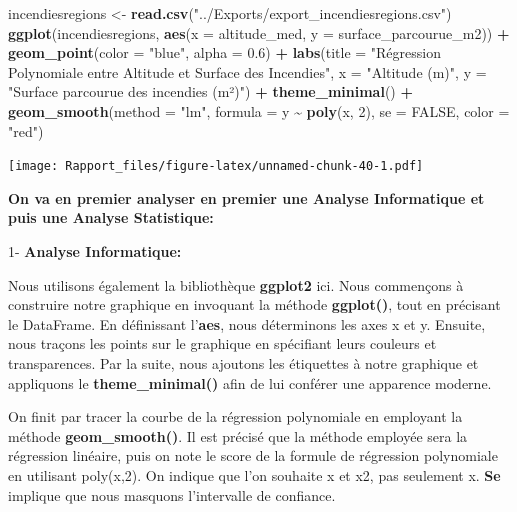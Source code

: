 \documentclass[
]{article}
\newenvironment{Shaded}{\begin{snugshade}}{\end{snugshade}}
\newcommand{\AttributeTok}[1]{\textcolor[rgb]{0.13,0.29,0.53}{#1}}
\newcommand{\ConstantTok}[1]{\textcolor[rgb]{0.56,0.35,0.01}{#1}}
\newcommand{\DecValTok}[1]{\textcolor[rgb]{0.00,0.00,0.81}{#1}}
\newcommand{\FloatTok}[1]{\textcolor[rgb]{0.00,0.00,0.81}{#1}}
\newcommand{\FunctionTok}[1]{\textcolor[rgb]{0.13,0.29,0.53}{\textbf{#1}}}
\newcommand{\NormalTok}[1]{#1}
\newcommand{\OtherTok}[1]{\textcolor[rgb]{0.56,0.35,0.01}{#1}}
\newcommand{\SpecialCharTok}[1]{\textcolor[rgb]{0.81,0.36,0.00}{\textbf{#1}}}
\newcommand{\StringTok}[1]{\textcolor[rgb]{0.31,0.60,0.02}{#1}}
\begin{document}
\begin{Shaded}
\begin{Highlighting}[]
\NormalTok{incendiesregions }\OtherTok{\textless{}{-}} \FunctionTok{read.csv}\NormalTok{(}\StringTok{"../Exports/export\_incendiesregions.csv"}\NormalTok{)}
\FunctionTok{ggplot}\NormalTok{(incendiesregions, }\FunctionTok{aes}\NormalTok{(}\AttributeTok{x =}\NormalTok{ altitude\_med, }\AttributeTok{y =}\NormalTok{ surface\_parcourue\_m2)) }\SpecialCharTok{+}
  \FunctionTok{geom\_point}\NormalTok{(}\AttributeTok{color =} \StringTok{"blue"}\NormalTok{, }\AttributeTok{alpha =} \FloatTok{0.6}\NormalTok{) }\SpecialCharTok{+}
  \FunctionTok{labs}\NormalTok{(}\AttributeTok{title =} \StringTok{"Régression Polynomiale entre Altitude et Surface des Incendies"}\NormalTok{,}
       \AttributeTok{x =} \StringTok{"Altitude (m)"}\NormalTok{, }\AttributeTok{y =} \StringTok{"Surface parcourue des incendies (m²)"}\NormalTok{) }\SpecialCharTok{+}
  \FunctionTok{theme\_minimal}\NormalTok{() }\SpecialCharTok{+}
  \FunctionTok{geom\_smooth}\NormalTok{(}\AttributeTok{method =} \StringTok{"lm"}\NormalTok{, }\AttributeTok{formula =}\NormalTok{ y }\SpecialCharTok{\textasciitilde{}} \FunctionTok{poly}\NormalTok{(x, }\DecValTok{2}\NormalTok{), }\AttributeTok{se =} \ConstantTok{FALSE}\NormalTok{, }\AttributeTok{color =} \StringTok{"red"}\NormalTok{)}
\end{Highlighting}
\end{Shaded}

\texttt{[image: Rapport\_files/figure-latex/unnamed-chunk-40-1.pdf]}

\textbf{On va en premier analyser en premier une Analyse Informatique et
puis une Analyse Statistique:}

1- \textbf{Analyse Informatique:}

Nous utilisons également la bibliothèque \textbf{ggplot2} ici. Nous
commençons à construire notre graphique en invoquant la méthode
\textbf{ggplot()}, tout en précisant le DataFrame. En définissant
l'\textbf{aes}, nous déterminons les axes x et y. Ensuite, nous traçons
les points sur le graphique en spécifiant leurs couleurs et
transparences. Par la suite, nous ajoutons les étiquettes à notre
graphique et appliquons le \textbf{theme\_minimal()} afin de lui
conférer une apparence moderne.

On finit par tracer la courbe de la régression polynomiale en employant
la méthode \textbf{geom\_smooth()}. Il est précisé que la méthode
employée sera la régression linéaire, puis on note le score de la
formule de régression polynomiale en utilisant poly(x,2). On indique que
l'on souhaite x et x2, pas seulement x. \textbf{Se} implique que nous
masquons l'intervalle de confiance.
\end{document}

